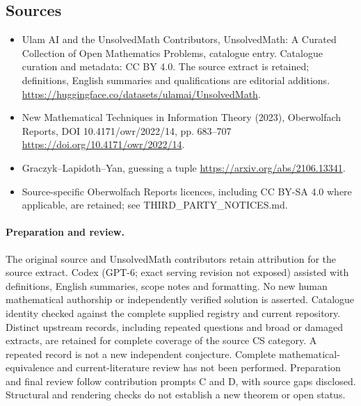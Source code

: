 \documentclass[11pt]{article}
\begin{document}
\subsection{Sources}
\begin{itemize}
\item[\hypertarget{source:statement:1}{S1}] Ulam AI and the UnsolvedMath Contributors, UnsolvedMath: A Curated Collection of Open Mathematics Problems, catalogue entry. Catalogue curation and metadata: CC BY 4.0. The source extract is retained; definitions, English summaries and qualifications are editorial additions.
\url{https://huggingface.co/datasets/ulamai/UnsolvedMath}.
\item[\hypertarget{source:statement:2}{S2}] New Mathematical Techniques in Information Theory (2023), Oberwolfach Reports, DOI 10.4171/owr/2022/14, pp. 683--707
\url{https://doi.org/10.4171/owr/2022/14}.
\item[\hypertarget{source:statement:3}{S3}] Graczyk--Lapidoth--Yan, guessing a tuple
\url{https://arxiv.org/abs/2106.13341}.
\item Source-specific Oberwolfach Reports licences, including CC BY-SA 4.0 where applicable, are retained; see THIRD\_PARTY\_NOTICES.md.
\end{itemize}
\paragraph{Preparation and review.}
The original source and UnsolvedMath contributors retain attribution for the source extract. Codex (GPT-6; exact serving revision not exposed) assisted with definitions, English summaries, scope notes and formatting. No new human mathematical authorship or independently verified solution is asserted. Catalogue identity checked against the complete supplied registry and current repository. Distinct upstream records, including repeated questions and broad or damaged extracts, are retained for complete coverage of the source CS category. A repeated record is not a new independent conjecture. Complete mathematical-equivalence and current-literature review has not been performed. Preparation and final review follow contribution prompts C and D, with source gaps disclosed. Structural and rendering checks do not establish a new theorem or open status.
\label{end:statement}
\end{document}
